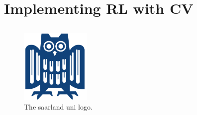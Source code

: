 \section{Implementing RL with CV}

\subsection{}

\begin{figure}[H]
\centering
\includegraphics[width=0.3\textwidth]{eule.png}
\caption{The saarland uni logo.}
\label{fig:logo}
\end{figure}
